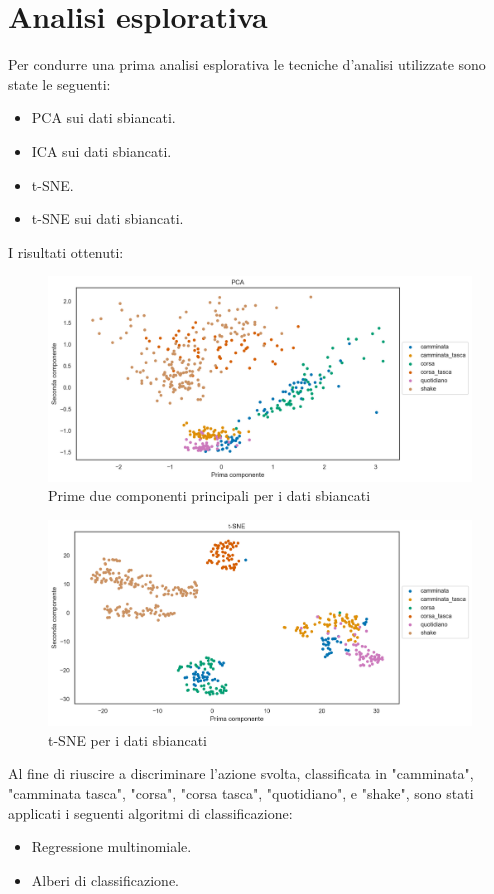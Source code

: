 \documentclass[./main.tex]{subfiles}
\begin{document}
\section{Analisi esplorativa}
Per condurre una prima analisi esplorativa le tecniche d'analisi utilizzate sono state le seguenti:
\begin{itemize}
	\item PCA sui dati sbiancati.
	\item ICA sui dati sbiancati.
	\item t-SNE.
	\item t-SNE sui dati sbiancati.
\end{itemize}
I risultati ottenuti:
\begin{figure}[H]
	\centering
	\includegraphics[width=.99\textwidth, keepaspectratio]{../../figure/PCA.png}
	\caption{{ Prime due componenti principali per i dati sbiancati}}
	\label{PCA}
\end{figure}


\begin{figure}[H]
	\centering
	\includegraphics[width=.99\textwidth, keepaspectratio]{../../figure/t-SNE.png}
	\caption{{ t-SNE per i dati sbiancati}}
	\label{tSNE}
\end{figure}
Al fine di riuscire a discriminare l'azione svolta, classificata in "camminata", "camminata tasca", "corsa", "corsa tasca", "quotidiano", e "shake", sono stati applicati i seguenti algoritmi di classificazione:
\begin{itemize}
	\item Regressione multinomiale.
	\item Alberi di classificazione.
\end{itemize}
\end{document}
